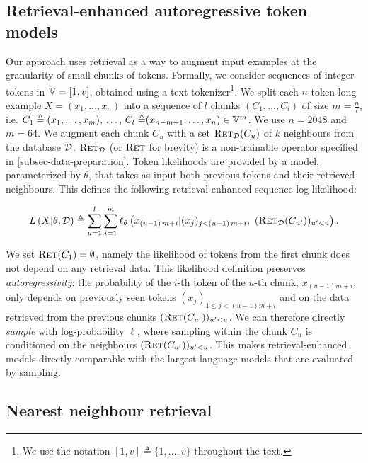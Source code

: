 \documentclass[11pt, a4paper, logo]{deepmind}
\newcommand{\ret}{\textsc{Ret}}
\begin{document}
\subsection{Retrieval-enhanced autoregressive token models}\label{subsec:probabilistic-model}
Our approach uses retrieval as a way to augment input examples at the granularity of small chunks of tokens.
Formally, we consider sequences of integer tokens in $\mathbb{V} = [1, v]$, obtained using a text tokenizer\footnote{We use the notation $[1, v] \triangleq \{1, \dots, v \}$ throughout the text.}.
We split each $n$-token-long example $X = (x_1, \dots, x_n)$ into a sequence of $l$ chunks $(C_1, \dots, C_l)$  of size $m=\frac{n}{l}$, i.e. $C_1  \triangleq {(x_1, \dots, x_m),\, \dots ,\, C_{l} \triangleq} (x_{n - m + 1}, \dots, x_n)  \in \mathbb{V}^{m}$. We use $n=2048$ and $m=64$.  
We augment each chunk $C_u$ with a set $\ret_\Dd(C_u)$ of $k$ neighbours from the database $\mathcal{D}$. 
$\ret_\Dd$ (or $\ret$ for brevity) is a non-trainable operator specified in \autoref{subsec-data-preparation}. 
Token likelihoods are provided by a model, parameterized by $\theta$, that takes as input both previous tokens and their retrieved neighbours. This defines the following retrieval-enhanced sequence log-likelihood:

\begin{equation}\label{eq:likelihood}
    L\left(X |\theta, \Dd \right)
    \triangleq \sum_{u=1}^{l} \sum_{i=1}^{m} \ell_\theta \left (x_{(u-1)\,m + i} | (x_j)_{j < (u-1)\,m + i},\ (\ret_\Dd(C_{u'}))_{u' < u} \right).
\end{equation}

We set $\ret(C_1) = \emptyset$, namely the likelihood of tokens from the first chunk does not depend on any retrieval data.
This likelihood definition preserves \textit{autoregressivity}: the probability of the $i$-th token of the $u$-th chunk, $x_{(u-1) m + i}$, only depends on previously seen tokens $(x_j)_{1 \leq j < (u-1)m + i}$ and on the data retrieved from the previous chunks
$(\ret(C_{u'}))_{u'<u}$. 
We can therefore directly \textit{sample} with log-probability $\ell$, where sampling within the chunk $C_u$ is conditioned on the neighbours $(\ret(C_{u'}))_{u'<u}$. 
This makes retrieval-enhanced models directly comparable with the largest language models that are evaluated by sampling.


\subsection{Nearest neighbour retrieval}
\label{subsec-data-preparation}
\end{document}
